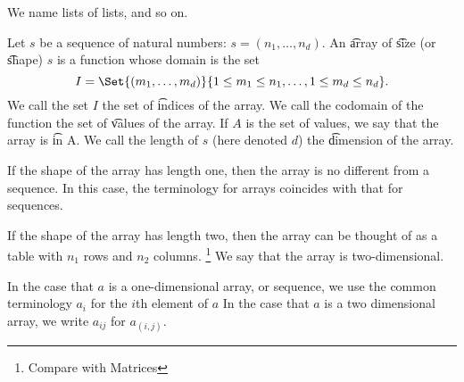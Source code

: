 

We name lists of lists, and so on.


Let $s$ be a sequence of natural numbers: $s = (n_1, \dots , n_d)$.
An \t{array} of \t{size} (or \t{shape}) $s$ is a function whose domain is the set
  \[
I = \Set{(m_1, \dots , m_d)}{ 1 \leq m_1 \leq n_1, \dots , 1 \leq m_d \leq n_d}.
  \]
We call the set $I$ the set of \t{indices} of the array.
We call the codomain of the function the set of \t{values} of the array.
If $A$ is the set of values, we say that the array is \t{in} A.
We call the length of $s$ (here denoted $d$) the \t{dimension} of the array.


If the shape of the array has length one, then the array is no different from a sequence.
In this case, the terminology for arrays coincides with that for sequences.


If the shape of the array has length two, then the array can be thought of as a table with $n_1$ rows and $n_2$ columns.
  \ifhmode\unskip\fi\footnote{
Compare with  {Matrices}
  }
We say that the array is two-dimensional.


In the case that $a$ is a one-dimensional array, or sequence, we use the common terminology $a_i$ for the $i$th element of $a$
In the case that $a$ is a two dimensional array, we write $a_{ij}$ for $a_{(i,j)}$.
